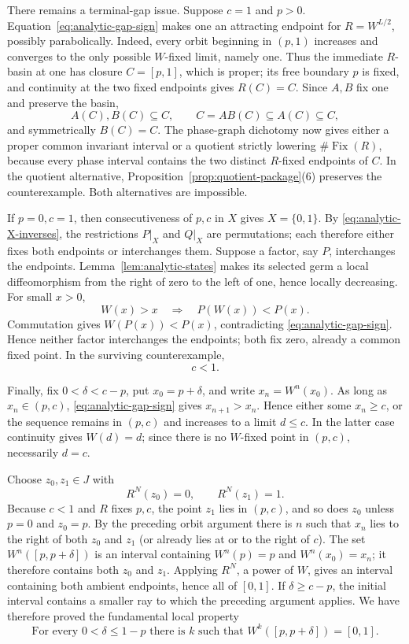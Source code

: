 \documentclass[11pt]{article}
\theoremstyle{definition}
\theoremstyle{remark}
\newcommand{\I}{[0,1]}
\newcommand{\Fix}{\operatorname{Fix}}
\begin{document}
There remains a terminal-gap issue.  Suppose \(c=1\) and \(p>0\).
Equation~\eqref{eq:analytic-gap-sign} makes one an attracting endpoint for
\(R=W^{L/2}\), possibly parabolically.  Indeed, every orbit beginning in
\((p,1)\) increases and converges to the only possible \(W\)-fixed limit,
namely one.  Thus the immediate \(R\)-basin at one has closure
\(C=[p,1]\), which is proper; its free boundary \(p\) is fixed, and
continuity at the two fixed endpoints gives \(R(C)=C\).
Since \(A,B\) fix one and preserve the basin,
\[
 A(C),B(C)\subseteq C,\qquad
 C=AB(C)\subseteq A(C)\subseteq C,
\]
and symmetrically \(B(C)=C\).  The phase-graph dichotomy now gives either a
proper common invariant interval or a quotient strictly lowering
\(\#\Fix(R)\), because every phase interval contains the two distinct
\(R\)-fixed endpoints of \(C\).  In the quotient alternative,
Proposition~\ref{prop:quotient-package}(6) preserves the counterexample.
Both alternatives are impossible.

If \(p=0,c=1\), then consecutiveness of \(p,c\) in \(X\) gives
\(X=\{0,1\}\).  By \eqref{eq:analytic-X-inverses}, the restrictions \(P|_X\) and
\(Q|_X\) are permutations; each therefore either fixes both endpoints or
interchanges them.  Suppose a factor, say \(P\), interchanges the endpoints.
Lemma~\ref{lem:analytic-states} makes its selected germ a local
diffeomorphism from the right of zero to the left of one, hence locally
decreasing.  For small \(x>0\),
\[
 W(x)>x\quad\Longrightarrow\quad P(W(x))<P(x).
\]
Commutation gives \(W(P(x))<P(x)\), contradicting
\eqref{eq:analytic-gap-sign}.  Hence neither factor interchanges the
endpoints; both fix zero, already a common fixed point.  In the surviving
counterexample,
\begin{equation}\label{eq:analytic-c-internal}
 c<1.
\end{equation}

Finally, fix $0<\delta<c-p$, put $x_0=p+\delta$, and write
$x_n=W^n(x_0)$.  As long as $x_n\in(p,c)$,
\eqref{eq:analytic-gap-sign} gives $x_{n+1}>x_n$.  Hence either some
$x_n\geq c$, or the sequence remains in $(p,c)$ and increases to a limit
$d\leq c$.  In the latter case continuity gives $W(d)=d$; since there is no
$W$-fixed point in $(p,c)$, necessarily $d=c$.

Choose $z_0,z_1\in J$ with
\[
 R^N(z_0)=0,\qquad R^N(z_1)=1.
\]
Because $c<1$ and $R$ fixes $p,c$, the point $z_1$ lies in $(p,c)$, and so
does $z_0$ unless $p=0$ and $z_0=p$.  By the preceding orbit argument there
is $n$ such that $x_n$ lies to the right of both $z_0$ and $z_1$ (or already
lies at or to the right of $c$).  The set
$W^n([p,p+\delta])$ is an interval containing
$W^n(p)=p$ and $W^n(x_0)=x_n$; it therefore contains both $z_0$ and $z_1$.
Applying $R^N$, a power of $W$, gives an interval containing both ambient
endpoints, hence all of $\I$.  If $\delta\geq c-p$, the initial interval
contains a smaller ray to which the preceding argument applies.  We have
therefore proved the fundamental local property
\begin{equation}\label{eq:analytic-LEO}
 \boxed{\text{For every }0<\delta\leq1-p\text{ there is }k\text{ such that }
 W^k([p,p+\delta])=\I.}
\end{equation}
\end{document}
